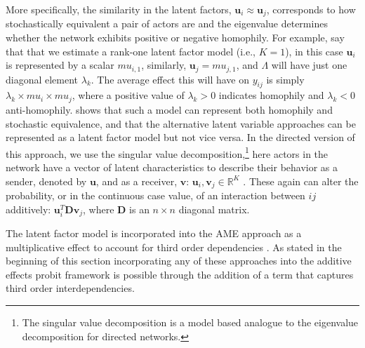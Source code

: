More specifically, the similarity in the latent factors, $\bm u_{i} \approx \bm u_{j}$, corresponds to how stochastically equivalent a pair of actors are and the eigenvalue determines whether the network exhibits positive or negative homophily. For example, say that that we estimate a rank-one latent factor model (i.e., $K=1$), in this case $\bm u_{i}$ is represented by a scalar $mu_{i,1}$, similarly, $\bm u_{j}=mu_{j,1}$, and $\Lambda$ will have just one diagonal element $\lambda_{k}$. The average effect this will have on $y_{ij}$ is simply $\lambda_{k} \times mu_{i} \times mu_{j}$, where a positive value of $\lambda_{k}>0$ indicates homophily and $\lambda_{k}<0$ anti-homophily. \citet{hoff:2008} shows that such a model can represent both homophily and stochastic equivalence, and that the alternative latent variable approaches can be represented as a latent factor model but not vice versa. In the directed version of this approach, we use the singular value decomposition,\footnote{The singular value decomposition is a model based analogue to the eigenvalue decomposition for directed networks.} here actors in the network have a vector of latent characteristics to describe their behavior as a sender, denoted by $\bm u$, and as a receiver, $\textbf{v}$: $\bm u_{i}, \textbf{v}_{j} \in \mathbb{R}^{K}$ \citep{hoff:2009}. These again can alter the probability, or in the continuous case value, of an interaction between $ij$ additively: $\bm u_{i}^{T} \textbf{D} \textbf{v}_{j}$, where $\textbf{D}$ is an $n \times n$ diagonal matrix. 

The latent factor model is incorporated into the AME approach as a multiplicative effect to account for third order dependencies \citep{hoff:2009,hoff:etal:2015}. As stated in the beginning of this section incorporating any of these approaches into the additive effects probit framework is possible through the addition of a term that captures third order interdependencies. 

